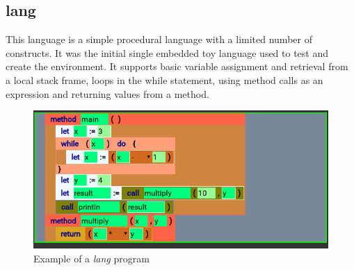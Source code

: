 \subsection{lang}

This language is a simple procedural language with a limited number of constructs. It was the initial single embedded toy language used to test and create the environment. It supports basic variable assignment and retrieval from a local stack frame, loops in the while statement, using method calls as an expression and returning values from a method.

\begin{figure}[htb]
\centering
\includegraphics[scale=0.5]{graphics/langprog} %
\caption{Example of a \textit{lang} program}
\label{fig:langprog} %
\end{figure}

